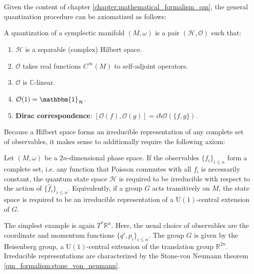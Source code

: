 \chapter{}

    Given the content of chapter \ref{chapter:mathematical_formalism_qm}, the general quantization procedure can be axiomatized as follows:

    \begin{method}
        A quantization of a symplectic manifold $(M,\omega)$ is a pair $(\mathcal{H},\mathcal{O})$ such that:
        \begin{enumerate}
            \item $\mathcal{H}$ is a separable (complex) Hilbert space.
            \item $\mathcal{O}$ takes real functions $C^\infty(M)$ to self-adjoint operators.
            \item $\mathcal{O}$ is $\mathbb{C}$-linear.
            \item $\mathcal{O}(1) = \mathbbm{1}_{\mathcal{H}}$.
            \item \textbf{Dirac correspondence}: $[\mathcal{O}(f),\mathcal{O}(g)] = i\hbar\mathcal{O}(\{f,g\})$.
        \end{enumerate}
    \end{method}

    Because a Hilbert space forms an irreducible representation of any complete set of observables, it makes sense to additionally require the following axiom:
    \begin{axiom}
        Let $(M,\omega)$ be a $2n$-dimensional phase space. If the observables $\{f_i\}_{i\leq n}$ form a complete set, i.e. any function that Poisson commutes with all $f_i$ is necessarily constant, the quantum state space $\mathcal{H}$ is required to be irreducible with respect to the action of $\{\hat{f}_i\}_{i\leq n}$. Equivalently, if a group $G$ acts transitively on $M$, the state space is required to be an irreducible representation of a $\text{U}(1)$-central extension of $G$.
    \end{axiom}
    The simplest example is again $T^*\mathbb{R}^n$. Here, the usual choice of observables are the coordinate and momentum functions $\{q^i,p_i\}_{i\leq n}$. The group $G$ is given by the Heisenberg group, a $\text{U}(1)$-central extension of the translation group $\mathbb{R}^{2n}$. Irreducible representations are characterized by the Stone-von Neumann theorem \ref{qm_formalism:stone_von_neumann}.

